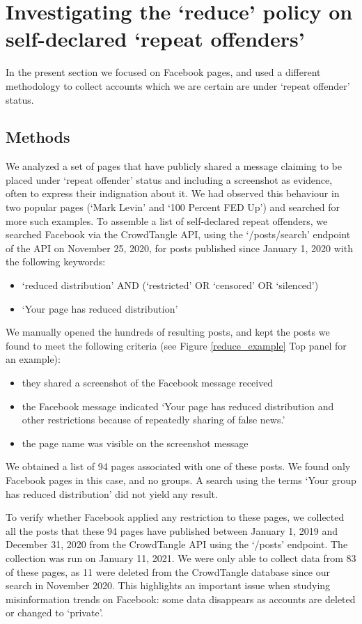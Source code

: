 \documentclass[11pt,a4paper]{article}
\begin{document}
\section{Investigating the `reduce' policy on self-declared `repeat offenders'}

In the present section we focused on Facebook pages, and used a different methodology to collect accounts which we are certain are under `repeat offender' status. 

\subsection{Methods}

We analyzed a set of pages that have publicly shared a message claiming to be placed under `repeat offender' status and including a screenshot as evidence, often to express their indignation about it. 
We had observed this behaviour in two popular pages (`Mark Levin' and `100 Percent FED Up') and searched for more such examples. 
To assemble a list of self-declared repeat offenders, we searched Facebook via the CrowdTangle API, using the `/posts/search' endpoint of the API on November 25, 2020, for posts published since January 1, 2020 with the following keywords:
\begin{itemize}
\item `reduced distribution' AND (`restricted' OR `censored' OR `silenced')
\item `Your page has reduced distribution'
\end{itemize}

We manually opened the hundreds of resulting posts, and kept the posts we found to meet the following criteria (see Figure \ref{reduce_example} Top panel for an example):
\begin{itemize}
\item they shared a screenshot of the Facebook message received
\item the Facebook message indicated `Your page has reduced distribution and other restrictions because of repeatedly sharing of false news.'
\item the page name was visible on the screenshot message
\end{itemize}

We obtained a list of 94 pages associated with one of these posts. 
We found only Facebook pages in this case, and no groups. 
A search using the terms `Your group has reduced distribution' did not yield any result.

To verify whether Facebook applied any restriction to these pages, we collected all the posts that these 94 pages have published between January 1, 2019 and December 31, 2020 from the CrowdTangle API using the `/posts' endpoint. 
The collection was run on January 11, 2021.
We were only able to collect data from 83 of these pages, as 11 were deleted from the CrowdTangle database since our search in November 2020. 
This highlights an important issue when studying misinformation trends on Facebook: some data disappears as accounts are deleted or changed to ‘private’.
\end{document}
